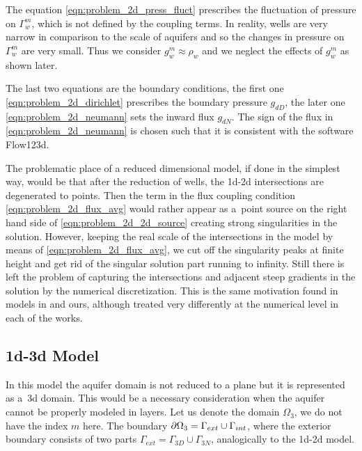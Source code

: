 The equation \eqref{eqn:problem_2d_press_fluct} prescribes the fluctuation of pressure on $\Gamma^m_w$,
which is not defined by the coupling terms. In reality, wells are very narrow in comparison to the scale of aquifers
and so the changes in pressure on $\Gamma^m_w$ are very small. Thus we consider $g^m_w \approx \rho_w$ and
we neglect the effects of $g^m_w$ as shown later.


The last two equations are the boundary conditions, the first one \eqref{eqn:problem_2d_dirichlet} prescribes the boundary pressure $g_{dD}$, 
the later one \eqref{eqn:problem_2d_neumann} sets the inward flux $g_{dN}$. The sign of the flux in \eqref{eqn:problem_2d_neumann}
is chosen such that it is consistent with the software Flow123d.

The problematic place of a reduced dimensional model, if done in the simplest way, would be that after the reduction of wells,
the 1d-2d intersections are degenerated to points. Then the term in the flux coupling condition \eqref{eqn:problem_2d_flux_avg} would rather
appear as a~point source on the right hand side of \eqref{eqn:problem_2d_2d_source} creating strong singularities in the solution.
However, keeping the real scale of the intersections in the model by means of \eqref{eqn:problem_2d_flux_avg}, we cut off the singularity peaks
at finite height and get rid of the singular solution part running to infinity.
Still there is left the problem of capturing the intersections and adjacent steep gradients in the solution by the numerical discretization.
This is the same motivation found in models in \cite{gracie_modelling_2010,craig_using_2011,koppl_vidotto_2018} and ours,
although treated very differently at the numerical level in each of the works.

\subsection{1d-3d Model}
In this model the aquifer domain is not reduced to a plane but it is represented as a~3d domain.
This would be a necessary consideration when the aquifer cannot be properly modeled in layers.
Let us denote the domain $\Omega_3$, we do not have the index $m$ here.
The boundary $\partial\Omega_3 = \Gamma_{ext} \cup \Gamma_{int}$,
where the exterior boundary consists of two parts $\Gamma_{ext} = \Gamma_{3D} \cup \Gamma_{3N}$,
analogically to the 1d-2d model.

